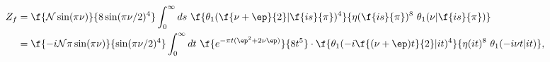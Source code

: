 \begin{equation}
\begin{split}
Z_{f}&=\f{{\cal N} \sin(\pi\nu)}{8\sin(\pi\nu/2)^4}\int_{0}^{\infty} ds\ 
\f{\theta_1(\f{\nu+\ep}{2}|\f{is}{\pi})^4}{\eta(\f{is}{\pi})^{8}\ 
\theta_1(\nu|\f{is}{\pi})}\\
&=\f{-i{\cal N\pi\sin(\pi\nu)}}{\sin(\pi\nu/2)^4}\int_{0}^{\infty} dt\ 
\f{e^{-\pi t(\ep^2+2\nu\ep)}}
{8t^{5}}\cdot
\f{\theta_1(-i\f{(\nu+\ep)t}{2}|it)^4}{\eta(it)^{8}\ 
\theta_1(-i\nu t|it)}
 \label{oamps},
\end{split}
\end{equation}

